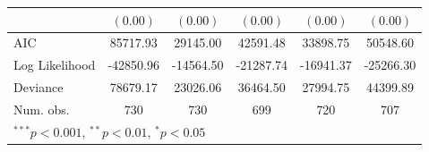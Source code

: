 \documentclass [11pt, proquest] {uwthesis}[2015/03/03]
\begin{document}
\begin{table}
\begin{center}
\begin{tabular}{l c c c c c }
               & $(0.00)$      & $(0.00)$      & $(0.00)$      & $(0.00)$      & $(0.00)$      \\
\hline
AIC            & 85717.93      & 29145.00      & 42591.48      & 33898.75      & 50548.60      \\
Log Likelihood & -42850.96     & -14564.50     & -21287.74     & -16941.37     & -25266.30     \\
Deviance       & 78679.17      & 23026.06      & 36464.50      & 27994.75      & 44399.89      \\
Num. obs.      & 730           & 730           & 699           & 720           & 707           \\
\hline
\multicolumn{6}{l}{\scriptsize{$^{***}p<0.001$, $^{**}p<0.01$, $^*p<0.05$}}
\end{tabular}
\label{tbl:multilocations}
\end{center}
\end{table}



\end{document}
